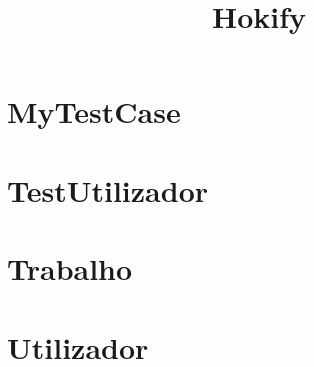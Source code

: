 \documentclass{article}
\begin{document}
\title{Hokify}
\author{}
\maketitle
\tableofcontents

\section{MyTestCase}

\section{TestUtilizador}

\section{Trabalho}

\section{Utilizador}

\end{document}
